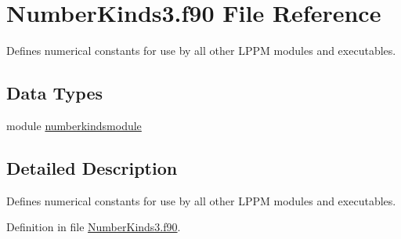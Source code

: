 \hypertarget{_number_kinds3_8f90}{\section{Number\+Kinds3.\+f90 File Reference}
\label{_number_kinds3_8f90}
}


Defines numerical constants for use by all other L\+P\+P\+M modules and executables.  


\subsection*{Data Types}
\begin{DoxyCompactItemize}
\item 
module \hyperlink{classnumberkindsmodule}{numberkindsmodule}
\end{DoxyCompactItemize}


\subsection{Detailed Description}
Defines numerical constants for use by all other L\+P\+P\+M modules and executables. 



Definition in file \hyperlink{_number_kinds3_8f90_source}{Number\+Kinds3.\+f90}.

